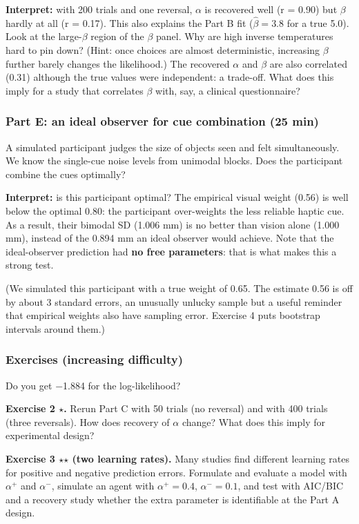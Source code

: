 \textbf{Interpret:} with 200 trials and one reversal, \(\alpha\) is
recovered well (r = 0.90) but \(\beta\) hardly at all (r = 0.17). This
also explains the Part B fit (\(\hat\beta = 3.8\) for a true 5.0). Look
at the large-\(\beta\) region of the \(\beta\) panel. Why are high
inverse temperatures hard to pin down? (Hint: once choices are almost
deterministic, increasing \(\beta\) further barely changes the
likelihood.) The recovered \(\alpha\) and \(\beta\) are also correlated
(0.31) although the true values were independent: a trade-off. What does
this imply for a study that correlates \(\beta\) with, say, a clinical
questionnaire?

\subsubsection{Part E: an ideal observer for cue combination (25 min)}

A simulated participant judges the size of objects seen and felt
simultaneously. We know the single-cue noise levels from unimodal
blocks. Does the participant combine the cues optimally?

\textbf{Interpret:} is this participant optimal? The empirical visual
weight (0.56) is well below the optimal 0.80: the participant
over-weights the less reliable haptic cue. As a result, their bimodal SD
(1.006 mm) is no better than vision alone (1.000 mm), instead of the
0.894 mm an ideal observer would achieve. Note that the ideal-observer
prediction had \textbf{no free parameters}: that is what makes this a
strong test.

(We simulated this participant with a true weight of 0.65. The estimate
0.56 is off by about 3 standard errors, an unusually unlucky sample but
a useful reminder that empirical weights also have sampling error.
Exercise 4 puts bootstrap intervals around them.)

\subsubsection{Exercises (increasing difficulty)}

Do you get −1.884 for the log-likelihood?

\textbf{Exercise 2 \ensuremath{\star}.} Rerun Part C with 50 trials (no reversal) and
with 400 trials (three reversals). How does recovery of \(\alpha\)
change? What does this imply for experimental design?

\textbf{Exercise 3 \ensuremath{\star}\ensuremath{\star} (two learning rates).} Many studies find different
learning rates for positive and negative prediction errors. Formulate and evaluate a
model with \(\alpha^{+}\) and \(\alpha^{-}\), simulate an agent with
\(\alpha^{+} = 0.4\), \(\alpha^{-} = 0.1\), and test with AIC/BIC and a
recovery study whether the extra parameter is identifiable at the Part A
design.

